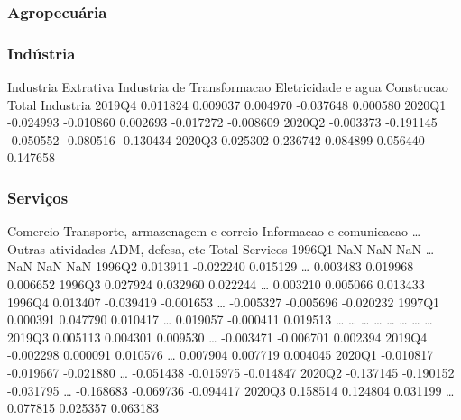 \documentclass{SelfArx}
\begin{document}
\subsubsection*{Agropecuária}
\label{sec:org0b6e053}

\subsubsection*{Indústria}
\label{sec:orgad35e72}

        Industria Extrativa  Industria de Transformacao  Eletricidade e agua  Construcao  Total Industria
2019Q4             0.011824                    0.009037             0.004970   -0.037648         0.000580
2020Q1            -0.024993                   -0.010860             0.002693   -0.017272        -0.008609
2020Q2            -0.003373                   -0.191145            -0.050552   -0.080516        -0.130434
2020Q3             0.025302                    0.236742             0.084899    0.056440         0.147658


\subsubsection*{Serviços}
\label{sec:orga5b65af}

        Comercio  Transporte, armazenagem e correio  Informacao e comunicacao  \ldots{}  Outras atividades  ADM, defesa, etc  Total Servicos
1996Q1       NaN                                NaN                       NaN  \ldots{}                NaN               NaN             NaN
1996Q2  0.013911                          -0.022240                  0.015129  \ldots{}           0.003483          0.019968        0.006652
1996Q3  0.027924                           0.032960                  0.022244  \ldots{}           0.003210          0.005066        0.013433
1996Q4  0.013407                          -0.039419                 -0.001653  \ldots{}          -0.005327         -0.005696       -0.020232
1997Q1  0.000391                           0.047790                  0.010417  \ldots{}           0.019057         -0.000411        0.019513
\ldots{}          \ldots{}                                \ldots{}                       \ldots{}  \ldots{}                \ldots{}               \ldots{}             \ldots{}
2019Q3  0.005113                           0.004301                  0.009530  \ldots{}          -0.003471         -0.006701        0.002394
2019Q4 -0.002298                           0.000091                  0.010576  \ldots{}           0.007904          0.007719        0.004045
2020Q1 -0.010817                          -0.019667                 -0.021880  \ldots{}          -0.051438         -0.015975       -0.014847
2020Q2 -0.137145                          -0.190152                 -0.031795  \ldots{}          -0.168683         -0.069736       -0.094417
2020Q3  0.158514                           0.124804                  0.031199  \ldots{}           0.077815          0.025357        0.063183
\end{document}
